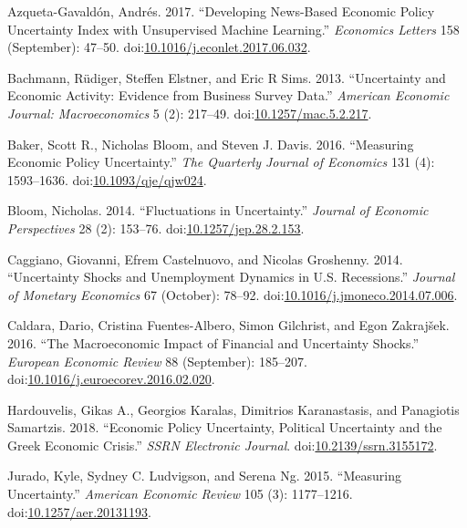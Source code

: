 \documentclass[11pt,preprint, authoryear]{elsarticle}
\numberwithin{equation}{section}
\numberwithin{figure}{section}
\numberwithin{table}{section}
\begin{document}
\hypertarget{refs}{}
\hypertarget{ref-Azqueta-Gavaldon2017}{}
Azqueta-Gavaldón, Andrés. 2017. ``Developing News-Based Economic Policy
Uncertainty Index with Unsupervised Machine Learning.'' \emph{Economics
Letters} 158 (September): 47--50.
doi:\href{https://doi.org/10.1016/j.econlet.2017.06.032}{10.1016/j.econlet.2017.06.032}.

\hypertarget{ref-Bachmann2013}{}
Bachmann, Rüdiger, Steffen Elstner, and Eric R Sims. 2013. ``Uncertainty
and Economic Activity: Evidence from Business Survey Data.''
\emph{American Economic Journal: Macroeconomics} 5 (2): 217--49.
doi:\href{https://doi.org/10.1257/mac.5.2.217}{10.1257/mac.5.2.217}.

\hypertarget{ref-Baker2016}{}
Baker, Scott R., Nicholas Bloom, and Steven J. Davis. 2016. ``Measuring
Economic Policy Uncertainty.'' \emph{The Quarterly Journal of Economics}
131 (4): 1593--1636.
doi:\href{https://doi.org/10.1093/qje/qjw024}{10.1093/qje/qjw024}.

\hypertarget{ref-Bloom2014}{}
Bloom, Nicholas. 2014. ``Fluctuations in Uncertainty.'' \emph{Journal of
Economic Perspectives} 28 (2): 153--76.
doi:\href{https://doi.org/10.1257/jep.28.2.153}{10.1257/jep.28.2.153}.

\hypertarget{ref-Caggiano2014}{}
Caggiano, Giovanni, Efrem Castelnuovo, and Nicolas Groshenny. 2014.
``Uncertainty Shocks and Unemployment Dynamics in U.S. Recessions.''
\emph{Journal of Monetary Economics} 67 (October): 78--92.
doi:\href{https://doi.org/10.1016/j.jmoneco.2014.07.006}{10.1016/j.jmoneco.2014.07.006}.

\hypertarget{ref-Caldara2016}{}
Caldara, Dario, Cristina Fuentes-Albero, Simon Gilchrist, and Egon
Zakrajšek. 2016. ``The Macroeconomic Impact of Financial and Uncertainty
Shocks.'' \emph{European Economic Review} 88 (September): 185--207.
doi:\href{https://doi.org/10.1016/j.euroecorev.2016.02.020}{10.1016/j.euroecorev.2016.02.020}.

\hypertarget{ref-Hardouvelis2018}{}
Hardouvelis, Gikas A., Georgios Karalas, Dimitrios Karanastasis, and
Panagiotis Samartzis. 2018. ``Economic Policy Uncertainty, Political
Uncertainty and the Greek Economic Crisis.'' \emph{SSRN Electronic
Journal}.
doi:\href{https://doi.org/10.2139/ssrn.3155172}{10.2139/ssrn.3155172}.

\hypertarget{ref-Jurado2015}{}
Jurado, Kyle, Sydney C. Ludvigson, and Serena Ng. 2015. ``Measuring
Uncertainty.'' \emph{American Economic Review} 105 (3): 1177--1216.
doi:\href{https://doi.org/10.1257/aer.20131193}{10.1257/aer.20131193}.
\end{document}
